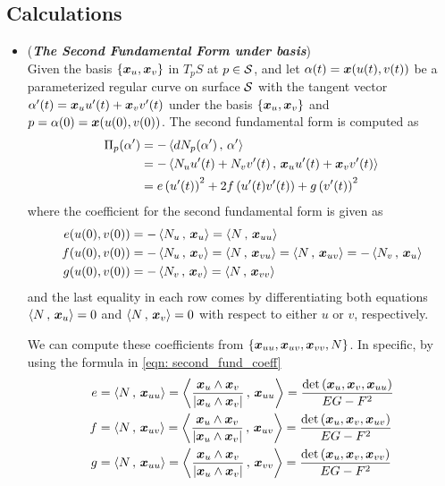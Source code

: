 \documentclass[11pt]{article}
\begin{document}
\subsection{Calculations}
\begin{itemize}
\item (\emph{\textbf{The Second Fundamental Form under basis}})\\
Given the basis $\left\{\boldsymbol{x}_{u}, \boldsymbol{x}_{v}\right\}$ in $T_{p}S$ at $p\in {\mathcal S}$, and let $\alpha(t) = \boldsymbol{x}(u(t), v(t))$ be a parameterized regular curve on surface ${\mathcal S}$ with the tangent vector $\alpha'(t) = \boldsymbol{x}_{u}u'(t) + \boldsymbol{x}_{v}v'(t) $ under the basis $\left\{\boldsymbol{x}_{u}, \boldsymbol{x}_{v}\right\}$ and $p=\alpha(0)= \boldsymbol{x}(u(0), v(0))$. The second fundamental form is computed as
\begin{align}
\Pi_{p}(\alpha') &=  -\left\langle dN_{p}(\alpha')\,,\, \alpha' \right\rangle\nonumber\\
&= -\left\langle N_{u}u'(t) + N_{v}v'(t)\,,\,  \boldsymbol{x}_{u}u'(t) + \boldsymbol{x}_{v}v'(t) \right\rangle\nonumber\\
&= e\left(u'(t)\right)^{2} + 2f\left(u'(t)v'(t)\right) + g\left(v'(t)\right)^{2} \label{eqn: second_fund_form_2}
\end{align}
where the coefficient for the second fundamental form is given as 
\begin{align}
e(u(0), v(0))&= - \left\langle N_{u}\,,\, \boldsymbol{x}_{u} \right\rangle = \left\langle N\,,\, \boldsymbol{x}_{uu} \right\rangle \nonumber\\
f(u(0), v(0))&= - \left\langle N_{u}\,,\, \boldsymbol{x}_{v} \right\rangle =  \left\langle N\,,\, \boldsymbol{x}_{vu} \right\rangle =  \left\langle N\,,\, \boldsymbol{x}_{uv} \right\rangle =  -\left\langle N_{v}\,,\, \boldsymbol{x}_{u} \right\rangle\nonumber\\
g(u(0), v(0))&=   - \left\langle N_{v}\,,\, \boldsymbol{x}_{v} \right\rangle = \left\langle N\,,\, \boldsymbol{x}_{vv} \right\rangle  \label{eqn: second_fund_coeff}
\end{align}
and the last equality in each row comes by differentiating both equations $\left\langle N\,,\, \boldsymbol{x}_{u} \right\rangle = 0$ and $\left\langle N\,,\, \boldsymbol{x}_{v} \right\rangle = 0$ with respect to either $u$ or $v$, respectively. 

We can compute these coefficients from $\left\{\boldsymbol{x}_{uu},\boldsymbol{x}_{uv}, \boldsymbol{x}_{vv}, N \right\}$. In specific, by using the formula in \eqref{eqn: second_fund_coeff}
\begin{align}
e &= \left\langle N\,,\, \boldsymbol{x}_{uu} \right\rangle = \left\langle \frac{\boldsymbol{x}_{u} \wedge \boldsymbol{x}_{v}}{\left\lvert \boldsymbol{x}_{u} \wedge \boldsymbol{x}_{v} \right\rvert}\,,\, \boldsymbol{x}_{uu} \right\rangle= \frac{\det\left( \boldsymbol{x}_{u} , \boldsymbol{x}_{v}, \boldsymbol{x}_{uu}  \right)}{EG- F^{2}} \nonumber\\
f &= \left\langle N\,,\, \boldsymbol{x}_{uv} \right\rangle = \left\langle \frac{\boldsymbol{x}_{u} \wedge \boldsymbol{x}_{v}}{\left\lvert \boldsymbol{x}_{u} \wedge \boldsymbol{x}_{v} \right\rvert}\,,\, \boldsymbol{x}_{uv} \right\rangle= \frac{\det\left( \boldsymbol{x}_{u} , \boldsymbol{x}_{v}, \boldsymbol{x}_{uv}  \right)}{EG- F^{2}} \nonumber\\
g &= \left\langle N\,,\, \boldsymbol{x}_{uu} \right\rangle = \left\langle \frac{\boldsymbol{x}_{u} \wedge \boldsymbol{x}_{v}}{\left\lvert \boldsymbol{x}_{u} \wedge \boldsymbol{x}_{v} \right\rvert}\,,\, \boldsymbol{x}_{vv} \right\rangle= \frac{\det\left( \boldsymbol{x}_{u} , \boldsymbol{x}_{v}, \boldsymbol{x}_{vv}  \right)}{EG- F^{2}} \label{eqn: second_fund_coeff_2}
\end{align}




\end{itemize}
\end{document}
